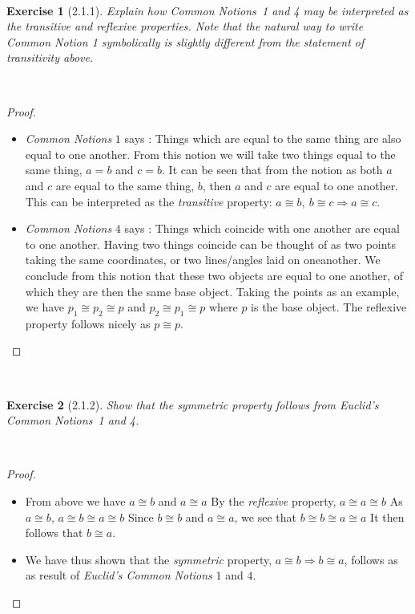 \documentclass[12pt]{article}
\newcommand{\XB}{\color{black}}
\newcommand{\XBB}{\color{blue}}
\theoremstyle{plain}
\newtheorem{ex}{Exercise}
\begin{document}
\newpage
\XBB\hrulefill\XB \\
\begin{ex} [2.1.1]
  Explain how Common Notions~1 and 4 may be interpreted as the transitive and reflexive properties. Note that the natural way to write Common Notion 1 symbolically is slightly different from the statement of transitivity above.
\end{ex}
\XBB\hrulefill\XB \\
\begin{proof}
  \ \\
  \begin{itemize}
    \item \textit{Common Notions} $1$ says : Things which are equal to the same thing are also equal to one another.
    \subitem From this notion we will take two things equal to the same thing, $ a = b $ and $ c = b $.
    \subitem It can be seen that from the notion as both $ a $ and $ c $ are equal to the same thing, $ b $, then $ a $ and $ c $ are equal to one another. 
    \subitem This can be interpreted as the \textit{transitive} property: $ a \cong b, \ b \cong c \Rightarrow a \cong c $.
    \item \textit{Common Notions} $4$ says : Things which coincide with one another are equal to one another.
    \subitem Having two things coincide can be thought of as two points taking the same coordinates, or two lines/angles laid on oneanother. 
    \subitem We conclude from this notion that these two objects are equal to one another, of which they are then the same base object. 
    \subitem Taking the points as an example, we have $ p_1 \cong p_2 \cong p $ and $ p_2 \cong p_1 \cong p $ where $ p $ is the base object.
    \subitem The reflexive property follows nicely as $ p \cong  p $.
  \end{itemize}
\end{proof}

\newpage
\XBB\hrulefill\XB \\
\begin{ex} [2.1.2]
  Show that the symmetric property follows from Euclid's Common Notions~1 and 4.
\end{ex}
\XBB\hrulefill\XB \\
\begin{proof}
  \ \\
  \begin{itemize}
    \item From above we have $ a \cong b $ and $ a \cong a $
    \subitem By the \textit{reflexive} property, $ a \cong a \cong b $
    \subitem As $ a \cong b $, $ a \cong b \cong a \cong b $
    \subitem Since $ b \cong b $ and $ a \cong a $, we see that $ b \cong b \cong a \cong a $
    \subitem It then follows that $ b \cong a $.
    \item We have thus shown that the \textit{symmetric} property, $ a \cong b \Rightarrow b \cong a $, follows as as result of \textit{Euclid's Common Notions} $1$ and $4$.
  \end{itemize}
\end{proof}
\end{document}
